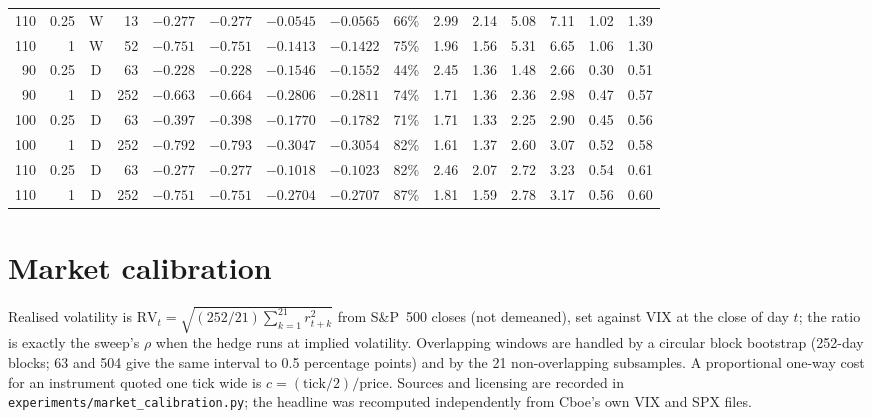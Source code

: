 \documentclass{article}
\begin{document}
\begin{table}[h]
\begin{tabular}{rrcr rr rr r rr rr rr}
    110 & 0.25 & W & 13 & $-0.277$ & $-0.277$ & $-0.0545$ & $-0.0565$ & 66\% & 2.99 & 2.14 & 5.08 & 7.11 & 1.02 & 1.39 \\
    110 & 1 & W & 52 & $-0.751$ & $-0.751$ & $-0.1413$ & $-0.1422$ & 75\% & 1.96 & 1.56 & 5.31 & 6.65 & 1.06 & 1.30 \\
    \midrule
    90 & 0.25 & D & 63 & $-0.228$ & $-0.228$ & $-0.1546$ & $-0.1552$ & 44\% & 2.45 & 1.36 & 1.48 & 2.66 & 0.30 & 0.51 \\
    90 & 1 & D & 252 & $-0.663$ & $-0.664$ & $-0.2806$ & $-0.2811$ & 74\% & 1.71 & 1.36 & 2.36 & 2.98 & 0.47 & 0.57 \\
    100 & 0.25 & D & 63 & $-0.397$ & $-0.398$ & $-0.1770$ & $-0.1782$ & 71\% & 1.71 & 1.33 & 2.25 & 2.90 & 0.45 & 0.56 \\
    100 & 1 & D & 252 & $-0.792$ & $-0.793$ & $-0.3047$ & $-0.3054$ & 82\% & 1.61 & 1.37 & 2.60 & 3.07 & 0.52 & 0.58 \\
    110 & 0.25 & D & 63 & $-0.277$ & $-0.277$ & $-0.1018$ & $-0.1023$ & 82\% & 2.46 & 2.07 & 2.72 & 3.23 & 0.54 & 0.61 \\
    110 & 1 & D & 252 & $-0.751$ & $-0.751$ & $-0.2704$ & $-0.2707$ & 87\% & 1.81 & 1.59 & 2.78 & 3.17 & 0.56 & 0.60 \\
    \bottomrule
  \end{tabular}
\end{table}

\section{Market calibration}\label{app:calibration}

Realised volatility is $\mathrm{RV}_t = \sqrt{(252/21)\sum_{k=1}^{21} r_{t+k}^2}$ from S\&P~500
closes (not demeaned), set against VIX at the close of day $t$; the ratio is exactly the sweep's
$\rho$ when the hedge runs at implied volatility. Overlapping windows are handled by a circular
block bootstrap (252-day blocks; 63 and 504 give the same interval to 0.5 percentage points) and
by the 21 non-overlapping subsamples. A proportional one-way cost for an instrument quoted one
tick wide is $c = (\text{tick}/2)/\text{price}$. Sources and licensing are recorded in
\texttt{experiments/market\_calibration.py}; the headline was recomputed independently from
Cboe's own VIX and SPX files.
\end{document}
